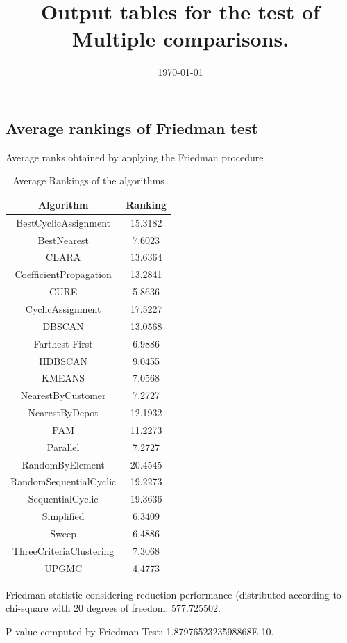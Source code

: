 \documentclass[a4paper,10pt]{article}
\title{Output tables for the test of Multiple comparisons.}
\author{}
\date{\today}
\begin{document}
\begin{landscape}
\pagestyle{empty}
\maketitle
\thispagestyle{empty}
\section{Average rankings of Friedman test}



Average ranks obtained by applying the Friedman procedure

\begin{table}[!htp]
\centering
\begin{tabular}{|c|c|}\hline
Algorithm&Ranking\\\hline
BestCyclicAssignment & 15.3182\\
BestNearest & 7.6023\\
CLARA & 13.6364\\
CoefficientPropagation & 13.2841\\
CURE & 5.8636\\
CyclicAssignment & 17.5227\\
DBSCAN & 13.0568\\
Farthest-First & 6.9886\\
HDBSCAN & 9.0455\\
KMEANS & 7.0568\\
NearestByCustomer & 7.2727\\
NearestByDepot & 12.1932\\
PAM & 11.2273\\
Parallel & 7.2727\\
RandomByElement & 20.4545\\
RandomSequentialCyclic & 19.2273\\
SequentialCyclic & 19.3636\\
Simplified & 6.3409\\
Sweep & 6.4886\\
ThreeCriteriaClustering & 7.3068\\
UPGMC & 4.4773\\
\hline
\end{tabular}
\caption{Average Rankings of the algorithms}
\end{table}

Friedman statistic considering reduction performance (distributed according to chi-square with 20 degrees of freedom: 577.725502.

P-value computed by Friedman Test: 1.8797652323598868E-10.\newline


\end{landscape}
\end{document}
